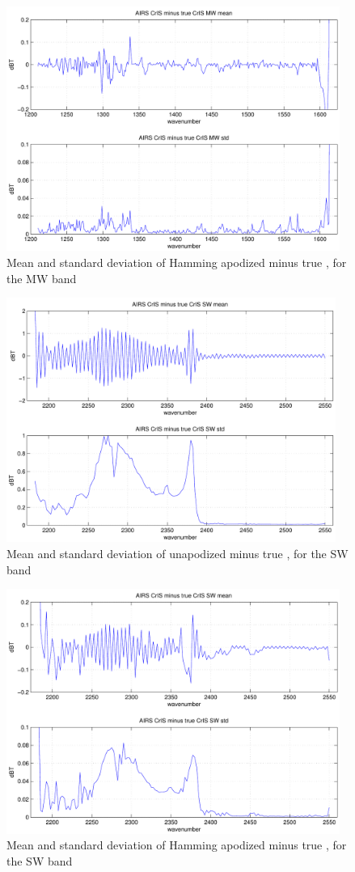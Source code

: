 \documentclass[12pt]{article}
\begin{document}
\begin{figure}
  \centering
  \includegraphics[height=8cm]{figures/airs_cris_diff_MW_hamm.pdf}
  \caption{Mean and standard deviation of Hamming apodized {\airs}
      {\cris} minus true {\cris}, for the {\cris} MW band }
  \label{acmwdh}
\end{figure}

\begin{figure}
  \centering
  \includegraphics[height=8cm]{figures/airs_cris_diff_SW_noap.pdf}
  \caption{Mean and standard deviation of unapodized {\airs} {\cris}
    minus true {\cris}, for the {\cris} SW band }
  \label{acswd}
\end{figure}

\begin{figure}
  \centering
  \includegraphics[height=8cm]{figures/airs_cris_diff_SW_hamm.pdf}
  \caption{Mean and standard deviation of Hamming apodized {\airs}
      {\cris} minus true {\cris}, for the {\cris} SW band }
  \label{acswdh}
\end{figure}
\end{document}
